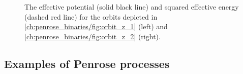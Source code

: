 \begin{figure}[!htbp]
  \centering
  \caption{The effective potential (solid black line) and squared effective energy (dashed red line) for the orbits depicted in \ref{ch:penrose_binaries/fig:orbit_z_1} (left) and \ref{ch:penrose_binaries/fig:orbit_z_2} (right).}
  \label{ch:penrose_binaries/fig:veff_graphs}
\end{figure}

\subsection{Examples of Penrose processes}

